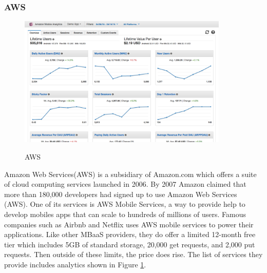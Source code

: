 \subsubsection{AWS}

\begin{figure}[!h]
    \caption{AWS}
    \centering
    \includegraphics[width=100mm]{images/aws}
    \label{fig:aws}
\end{figure}

Amazon Web Services(AWS) \cite{aws} is a subsidiary of Amazon.com which offers a suite of cloud computing services launched in 2006. By 2007 Amazon claimed that more than 180,000 developers had signed up to use Amazon Web Services (AWS). One of its services is AWS Mobile Services, a way to provide help to develop mobiles apps that can scale to hundreds of millions of users. Famous companies such as Airbnb and Netflix uses AWS mobile services to power their applications. Like other MBaaS providers, they do offer a limited 12-month free tier which includes 5GB of standard storage, 20,000 get requests, and 2,000 put requests. Then outside of these limits, the price does rise. The list of services they provide includes analytics shown in Figure \ref{fig:aws}.




